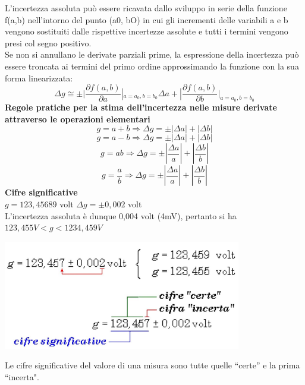 \documentclass{article}
\begin{document}
L'incertezza assoluta può essere ricavata dallo sviluppo in serie della funzione f(a,b) 
nell’intorno del punto (a0, bO) in cui gli incrementi delle variabili a e b vengono sostituiti 
dalle rispettive incertezze assolute e tutti i termini vengono presi col segno positivo.\\ Se 
non si annullano le derivate parziali prime, la espressione della incertezza può essere 
troncata ai termini del primo ordine approssimando la funzione con la sua forma 
linearizzata:
\begin{equation}
    \Delta g \cong \pm \vert \frac{\partial f(a,b)}{\partial a}|_{a=a_{0},b=b_{0}} \Delta a+|\frac{\partial f(a,b)}{\partial b}|_{a=a_{0},b=b_{0}}
\end{equation}
\textbf{Regole pratiche per la stima dell’incertezza nelle misure derivate attraverso le operazioni elementari}
\begin{equation}
    g=a+b \Rightarrow \Delta g = \pm |\Delta a|+|\Delta b|
\end{equation}
\begin{equation}
    g=a-b \Rightarrow \Delta g = \pm |\Delta a|+|\Delta b|
\end{equation}
\begin{equation}
    g=ab \Rightarrow \Delta g = \pm |\frac{\Delta a}{a}|+|\frac{\Delta b}{b}|
\end{equation}
\begin{equation}
    g=\frac{a}{b} \Rightarrow \Delta g = \pm |\frac{\Delta a}{a}|+|\frac{\Delta b}{b}|
\end{equation}
\textbf{Cifre significative } \\
$g = 123,45689$ volt $\Delta g = \pm 0,002$ volt \\
L'incertezza assoluta è dunque 0,004 volt (4mV), pertanto si ha $123,455 V < g < 1234,459 V$  
\begin{center}
    \includegraphics[scale=0.9]{Cifre Significative.png}
\end{center}
Le cifre significative del valore di una misura sono tutte quelle “certe” e la prima “incerta".\\\\
\end{document}
